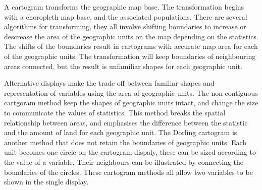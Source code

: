 \documentclass[conference,final,]{IEEEtran}
\begin{document}
A cartogram transforms the geographic map base. The transformation
begins with a choropleth map base, and the associated populations. There
are several algorithms for transforming, they all involve shifting
boundaries to increase or descrease the area of the geographic units on
the map depending on the statistics. The shifts of the boundaries result
in cartograms with accurate map area for each of the geographic units.
The transformation will keep boundaries of neighbouring areas connected,
but the result is unfamiliar shapes for each geographic unit.

Alternative displays make the trade off between familiar shapes and
representation of variables using the area of geographic units. The
non-contiguous cartgoram method keep the shapes of geographic units
intact, and change the size to communicate the values of statistics.
This method breaks the spatial relationship between areas, and
emphasises the difference between the statistic and the amount of land
for each geographic unit. The Dorling cartogram is another method that
does not retain the boundaries of geographic units. Each unit becomes
one circle on the cartogram dispaly, these can be sized according to the
value of a variable. Their neighbours can be illustrated by connecting
the boundaries of the circles. These cartogram methods all allow two
variables to be shown in the single display.
\end{document}
